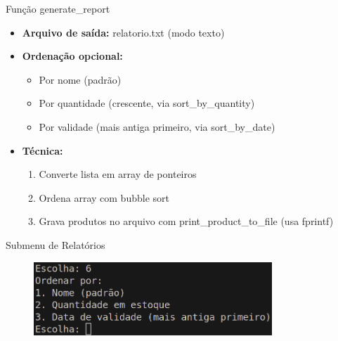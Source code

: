 \documentclass{beamer}
\begin{document}
\begin{frame}{Função generate\_report}
    \begin{itemize}
        \item \textbf{Arquivo de saída:} relatorio.txt (modo texto)
        \item \textbf{Ordenação opcional:}
        \begin{itemize}
            \item Por nome (padrão)
            \item Por quantidade (crescente, via sort\_by\_quantity)
            \item Por validade (mais antiga primeiro, via sort\_by\_date)
        \end{itemize}
        \item \textbf{Técnica:}
        \begin{enumerate}
            \item Converte lista em array de ponteiros
            \item Ordena array com bubble sort
            \item Grava produtos no arquivo com print\_product\_to\_file (usa fprintf)
        \end{enumerate}
    \end{itemize}
\end{frame}

\begin{frame}{Submenu de Relatórios}
    \begin{figure}
        \centering
        \includegraphics[width=0.8\textwidth]{img/submenu-relatorio.png}
    \end{figure}
\end{frame}
\end{document}
